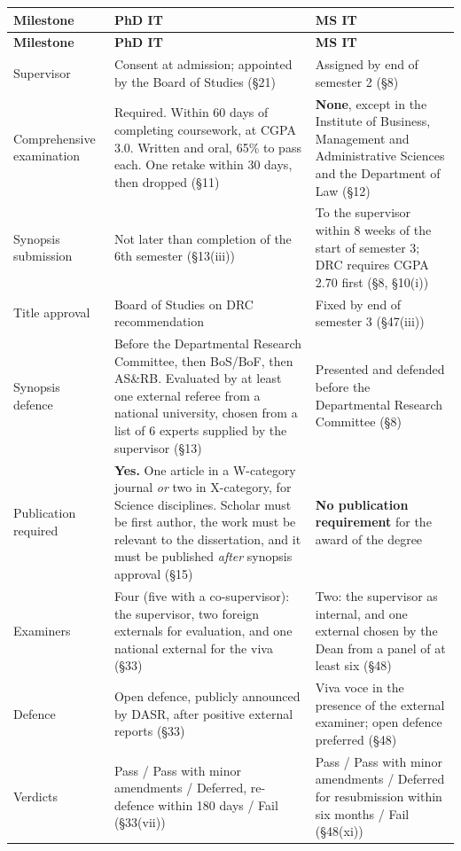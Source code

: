 \begin{center}
\small
\begin{longtable}{@{}L{3.5cm}L{5.5cm}L{5.5cm}@{}}
\toprule
\textbf{Milestone} & \textbf{PhD IT} & \textbf{MS IT} \\
\midrule
\endfirsthead
\toprule
\textbf{Milestone} & \textbf{PhD IT} & \textbf{MS IT} \\
\midrule
\endhead
\bottomrule
\endfoot
Supervisor
  & Consent at admission; appointed by the Board of Studies (\S21)
  & Assigned by end of semester 2 (\S8) \\
Comprehensive examination
  & Required. Within 60 days of completing coursework, at CGPA 3.0. Written
    and oral, 65\% to pass each. One retake within 30 days, then dropped (\S11)
  & \textbf{None}, except in the Institute of Business, Management and
    Administrative Sciences and the Department of Law (\S12) \\
Synopsis submission
  & Not later than completion of the 6th semester (\S13(iii))
  & To the supervisor within 8 weeks of the start of semester 3; DRC requires
    CGPA 2.70 first (\S8, \S10(i)) \\
Title approval
  & Board of Studies on DRC recommendation
  & Fixed by end of semester 3 (\S47(iii)) \\
Synopsis defence
  & Before the Departmental Research Committee, then BoS/BoF, then AS\&RB.
    Evaluated by at least one external referee from a national university,
    chosen from a list of 6 experts supplied by the supervisor (\S13)
  & Presented and defended before the Departmental Research Committee (\S8) \\
Publication required
  & \textbf{Yes.} One article in a W-category journal \emph{or} two in
    X-category, for Science disciplines. Scholar must be first author, the
    work must be relevant to the dissertation, and it must be published
    \emph{after} synopsis approval (\S15)
  & \textbf{No publication requirement} for the award of the degree \\
Examiners
  & Four (five with a co-supervisor): the supervisor, two foreign
    externals for evaluation, and one national external for the viva (\S33)
  & Two: the supervisor as internal, and one external chosen by the Dean from
    a panel of at least six (\S48) \\
Defence
  & Open defence, publicly announced by DASR, after positive external reports (\S33)
  & Viva voce in the presence of the external examiner; open defence preferred (\S48) \\
Verdicts
  & Pass / Pass with minor amendments / Deferred, re-defence within 180 days /
    Fail (\S33(vii))
  & Pass / Pass with minor amendments / Deferred for resubmission within
    six months / Fail (\S48(xi)) \\
\end{longtable}
\end{center}


